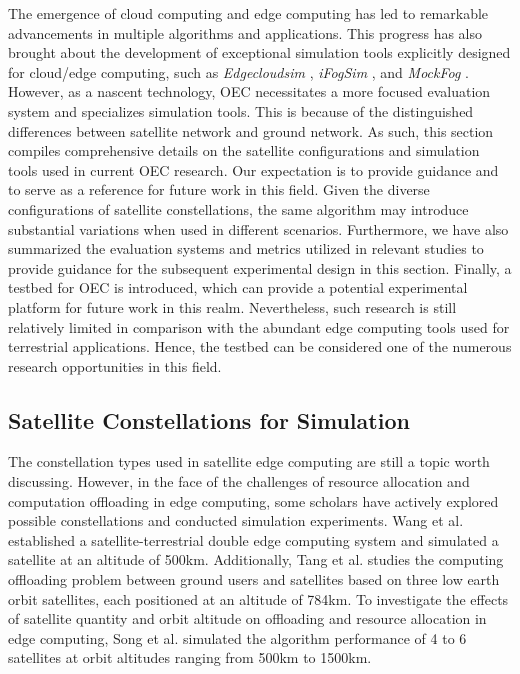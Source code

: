 \documentclass[lettersize,journal]{IEEEtran}
\begin{document}
The emergence of cloud computing and edge computing has led to remarkable advancements in multiple algorithms and applications. This progress has also brought about the development of exceptional simulation tools explicitly designed for cloud/edge computing, such as \textit{Edgecloudsim} \cite{RN140}, \textit{iFogSim} \cite{iFogsim}, and \textit{MockFog} \cite{mockfog}. However, as a nascent technology, OEC necessitates a more focused evaluation system and specializes simulation tools. This is because of the distinguished differences between satellite network and ground network. As such, this section compiles comprehensive details on the satellite configurations and simulation tools used in current OEC research. Our expectation is to provide guidance and to serve as a reference for future work in this field. Given the diverse configurations of satellite constellations, the same algorithm may introduce substantial variations when used in different scenarios. Furthermore, we have also summarized the evaluation systems and metrics utilized in relevant studies to provide guidance for the subsequent experimental design in this section. Finally, a testbed for OEC is introduced, which can provide a potential experimental platform for future work in this realm. Nevertheless, such research is still relatively limited in comparison with the abundant edge computing tools used for terrestrial applications. Hence, the testbed can be considered one of the numerous research opportunities in this field.

\subsection{Satellite Constellations for Simulation}
The constellation types used in satellite edge computing are still a topic worth discussing. However, in the face of the challenges of resource allocation and computation offloading in edge computing, some scholars have actively explored possible constellations and conducted simulation experiments. Wang et al. \cite{RN80} established a satellite-terrestrial double edge computing system and simulated a satellite at an altitude of 500km. Additionally, Tang et al. \cite{RN77} studies the computing offloading problem between ground users and satellites based on three low earth orbit satellites, each positioned at an altitude of 784km. To investigate the effects of satellite quantity and orbit altitude on offloading and resource allocation in edge computing, Song et al. \cite{RN76} simulated the algorithm performance of 4 to 6 satellites at orbit altitudes ranging from 500km to 1500km. 
\end{document}
